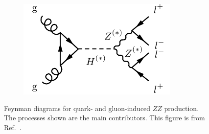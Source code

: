\begin{figure}
\begin{subfigure}{.24\textwidth}
  \caption{\ggZZ}
  \label{fig:m4lfeynman:ggZZ}
\end{subfigure}
\begin{subfigure}{.24\textwidth}
  \centering
  \includegraphics[width=.99\textwidth]{Figures/FeynGraphs/ggZZ4lhiggs.pdf}
  \caption{\ggHZZ}
  \label{fig:m4lfeynman:ggHZZ}
\end{subfigure}
\caption{Feynman diagrams for quark- and gluon-induced $ZZ$ production. The processes shown are the main contributors. This figure is from Ref.~\cite{m4l2021_paper}.}
\label{fig:m4lfeynman}
\end{figure}

